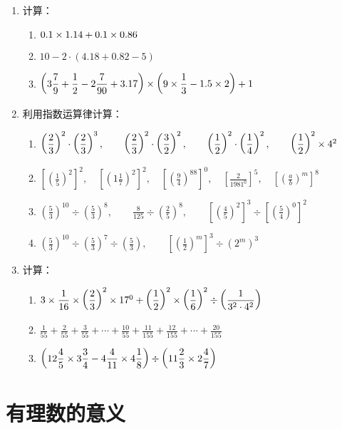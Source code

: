 \begin{enumerate}
\item 计算：
\begin{enumerate}
    \item $0.1\times 1.14+0.1\times 0.86$
    \item $10-2\cdot (4.18+0.82-5)$
    \item $\left(3\dfrac{7}{9}+\dfrac{1}{2}-2\dfrac{7}{90}+3.17\right)\times\left(9\times\dfrac{1}{3}-1.5\times 2\right)+1$
\end{enumerate}

\item 利用指数运算律计算：
\begin{enumerate}
    \item $\left(\dfrac{2}{3}\right)^2\cdot \left(\dfrac{2}{3}\right)^3,\qquad \left(\dfrac{2}{3}\right)^2\cdot \left(\dfrac{3}{2}\right)^2,\qquad \left(\dfrac{1}{2}\right)^2\cdot \left(\dfrac{1}{4}\right)^2,\qquad \left(\dfrac{1}{2}\right)^2\times 4^2$
    \item $\left[\left(\frac{1}{5}\right)^2\right]^2,\quad \left[\left(1\frac{1}{7}\right)^2\right]^2,\quad \left[\left(\frac{9}{4}\right)^{88}\right]^0,\quad \left[\frac{2}{1981^0}\right]^5,\quad \left[\left(\frac{a}{b}\right)^m\right]^8$
    \item $\left(\frac{5}{3}\right)^{10}\div \left(\frac{5}{3}\right)^8,\qquad \frac{8}{125}\div\left(\frac{2}{5}\right)^8,\qquad \left[\left(\frac{4}{5}\right)^2\right]^3\div \left[\left(\frac{5}{4}\right)^0\right]^2$
    \item $\left(\frac{5}{3}\right)^{10}\div \left(\frac{5}{3}\right)^7\div \left(\frac{5}{3}\right),\qquad \left[\left(\frac{1}{2}\right)^m\right]^3\div (2^m)^3$
\end{enumerate}

\item 计算：
\begin{enumerate}
    \item $3\times\dfrac{1}{16}\times\left(\dfrac{2}{3}\right)^2\times 17^0+\left(\dfrac{1}{2}\right)^2\times\left(\dfrac{1}{6}\right)^2\div \left(\dfrac{1}{3^2\cdot 4^2}\right)$
    \item  $\frac{1}{55}+\frac{2}{55}+\frac{3}{55}+\cdots+\frac{10}{55}+\frac{11}{155}+\frac{12}{155}+\cdots +\frac{20}{155}$ 
      \item $\left(12\dfrac{4}{5}\times 3\dfrac{3}{4}-4\dfrac{4}{11}\times 4\dfrac{1}{8}\right)\div \left(11\dfrac{2}{3}\times 2\dfrac{4}{7}\right)$
\end{enumerate}

\end{enumerate}

\section{有理数的意义}

